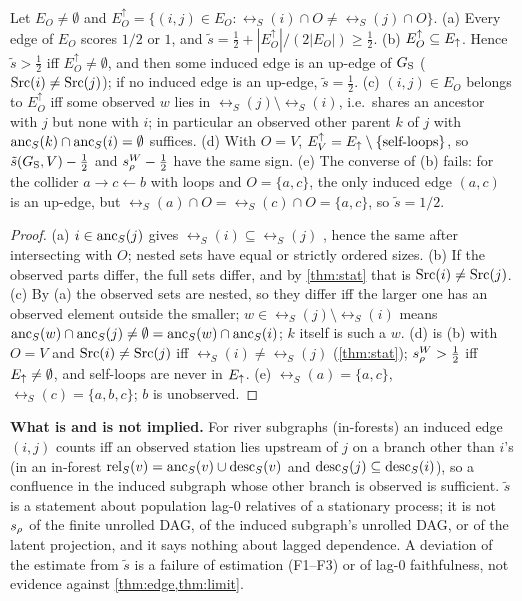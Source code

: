 \begin{proposition}\label{prop:estimand}
Let $E_O\ne\emptyset$ and $E_O^\uparrow=\{(i,j)\in E_O:\rel_S(i)\cap O\ne\rel_S(j)\cap O\}$.
(a) Every edge of $E_O$ scores $1/2$ or $1$, and
$\tilde s=\tfrac12+|E_O^\uparrow|/(2|E_O|)\ge\tfrac12$.
(b) $E_O^\uparrow\subseteq E_{\uparrow}$. Hence $\tilde s>\tfrac12$ iff
$E_O^\uparrow\neq\emptyset$, and then some induced edge is an up-edge of $G_{\mathrm S}$
($\mathrm{Src}(i)\ne\mathrm{Src}(j)$); if no induced edge is an up-edge, $\tilde s=\tfrac12$.
(c) $(i,j)\in E_O$ belongs to $E_O^\uparrow$ iff some observed $w$ lies in
$\rel_S(j)\setminus\rel_S(i)$, i.e.\ shares an ancestor with $j$ but none with
$i$; in particular an observed other parent $k$ of $j$ with
$\mathrm{anc}_S(k)\cap\mathrm{anc}_S(i)=\emptyset$ suffices.
(d) With $O=V$, $E_V^\uparrow=E_{\uparrow}\setminus\{\text{self-loops}\}$, so
$\tilde s(G_{\mathrm S},V)-\tfrac12$ and $s_\rho^W-\tfrac12$ have the same sign.
(e) The converse of (b) fails: for the collider $a\to c\leftarrow b$ with loops
and $O=\{a,c\}$, the only induced edge $(a,c)$ is an up-edge, but
$\rel_S(a)\cap O=\rel_S(c)\cap O=\{a,c\}$, so $\tilde s=1/2$.
\end{proposition}
\begin{proof}
(a) $i\in\mathrm{anc}_S(j)$ gives $\rel_S(i)\subseteq\rel_S(j)$
\citep[Thm.~1]{reisach2026topological}, hence the same after intersecting with
$O$; nested sets have equal or strictly ordered sizes. (b) If the observed parts
differ, the full sets differ, and by \cref{thm:stat} that is $\mathrm{Src}(i)\ne\mathrm{Src}(j)$.
(c) By (a) the observed sets are nested, so they differ iff the larger one has
an observed element outside the smaller; $w\in\rel_S(j)\setminus\rel_S(i)$ means
$\mathrm{anc}_S(w)\cap\mathrm{anc}_S(j)\ne\emptyset=\mathrm{anc}_S(w)\cap\mathrm{anc}_S(i)$; $k$ itself is such a
$w$. (d) is (b) with $O=V$ and $\mathrm{Src}(i)\ne\mathrm{Src}(j)$ iff $\rel_S(i)\ne\rel_S(j)$
(\cref{thm:stat}); $s_\rho^W>\tfrac12$ iff $E_{\uparrow}\ne\emptyset$, and self-loops are
never in $E_{\uparrow}$. (e) $\rel_S(a)=\{a,c\}$, $\rel_S(c)=\{a,b,c\}$; $b$ is unobserved.
\end{proof}

\textbf{What is and is not implied.} For river subgraphs (in-forests) an
induced edge $(i,j)$ counts iff an observed station lies upstream of $j$ on a
branch other than $i$'s (in an in-forest $\mathrm{rel}_S(v)=\mathrm{anc}_S(v)\cup\mathrm{desc}_S(v)$ and
$\mathrm{desc}_S(j)\subseteq\mathrm{desc}_S(i)$), so a confluence in the induced subgraph whose
other branch is observed is sufficient. $\tilde s$ is a statement about
population lag-0 relatives of a stationary process; it is not
$s_\rho$ of the finite unrolled DAG, of the induced subgraph's unrolled DAG, or
of the latent projection, and it says nothing about lagged dependence. A
deviation of the estimate from $\tilde s$ is a failure of estimation (F1--F3)
or of lag-0 faithfulness, not evidence against \cref{thm:edge,thm:limit}.

